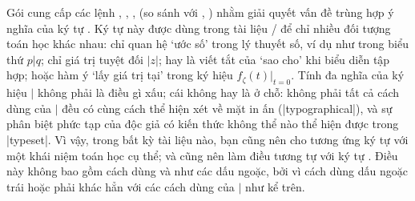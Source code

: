 \documentclass[11pt,leqno,titlepage,openany,oneside]{amsldoc}[1999/12/13]
\begin{document}
Gói  cung cấp các lệnh , ,
,  (so sánh với , ) nhằm
giải quyết vấn đề trùng hợp ý nghĩa của ký tự \qc{\|}.
Ký tự này được dùng trong tài liệu \latex/ để chỉ nhiều đối tượng
toán học khác nhau: chỉ quan hệ `ước số' trong lý thuyết số, ví dụ như
trong biểu thứ $p\vert q$; chỉ giá trị tuyệt đối $\lvert z\rvert$; hay
là viết tắt của `sao cho' khi biểu diễn tập hợp; hoặc hàm ý `lấy giá trị tại'
trong ký hiệu $f_\zeta(t)\bigr\rvert_{t=0}$.
Tính đa nghĩa của ký hiệu $\vert$ không phải là điều gì xấu; cái không
hay là ở chỗ: không phải tất cả cách dùng của $\vert$ đều có cùng cách thể hiện
xét về mặt in ấn (|typographical|), và sự phân biệt phức tạp của độc giả
có kiến thức không thể nào thể hiện được trong |typeset|.
Vì vậy, trong bất kỳ tài liệu nào, bạn cũng nên cho tương ứng ký tự \qc{\|}
với một khái niệm toán học cụ thể; và cũng nên làm điều tương tự với ký tự
\cn{\|}.
Điều này không bao gồm cách dùng \qc{|} và \ncn{\|}
như các dấu ngoặc, bởi vì cách dùng dấu ngoặc trái hoặc phải khác hẳn với
các cách dùng của $\vert$ như kể trên.
\end{document}
